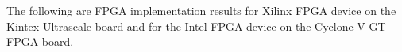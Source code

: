 The following are FPGA implementation results for Xilinx FPGA device on the Kintex Ultrascale board
and for the Intel FPGA device on the Cyclone V GT FPGA board.


